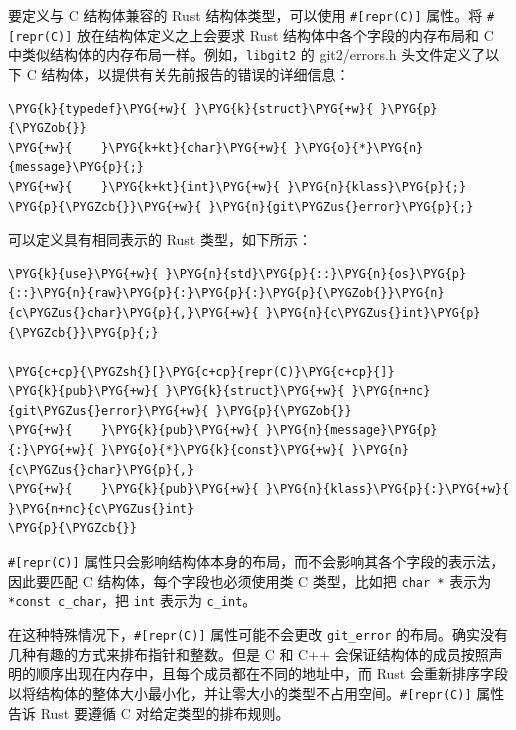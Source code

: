 要定义与 C 结构体兼容的 Rust 结构体类型，可以使用 \texttt{\#[repr(C)]} 属性。将 \texttt{\#[repr(C)]} 放在结构体定义之上会要求 Rust 结构体中各个字段的内存布局和 C 中类似结构体的内存布局一样。例如，\texttt{libgit2} 的 git2/\allowbreak{}errors.h 头文件定义了以下 C 结构体，以提供有关先前报告的错误的详细信息：

\begin{Verbatim}[commandchars=\\\{\},breaklines=true,breakanywhere=true,fontsize=\codefont,xleftmargin=17bp]
\PYG{k}{typedef}\PYG{+w}{ }\PYG{k}{struct}\PYG{+w}{ }\PYG{p}{\PYGZob{}}
\PYG{+w}{    }\PYG{k+kt}{char}\PYG{+w}{ }\PYG{o}{*}\PYG{n}{message}\PYG{p}{;}
\PYG{+w}{    }\PYG{k+kt}{int}\PYG{+w}{ }\PYG{n}{klass}\PYG{p}{;}
\PYG{p}{\PYGZcb{}}\PYG{+w}{ }\PYG{n}{git\PYGZus{}error}\PYG{p}{;}
\end{Verbatim}

可以定义具有相同表示的 Rust 类型，如下所示：

\begin{Verbatim}[commandchars=\\\{\},breaklines=true,breakanywhere=true,fontsize=\codefont,xleftmargin=17bp]
\PYG{k}{use}\PYG{+w}{ }\PYG{n}{std}\PYG{p}{::}\PYG{n}{os}\PYG{p}{::}\PYG{n}{raw}\PYG{p}{:}\PYG{p}{:}\PYG{p}{\PYGZob{}}\PYG{n}{c\PYGZus{}char}\PYG{p}{,}\PYG{+w}{ }\PYG{n}{c\PYGZus{}int}\PYG{p}{\PYGZcb{}}\PYG{p}{;}

\PYG{c+cp}{\PYGZsh{}[}\PYG{c+cp}{repr(C)}\PYG{c+cp}{]}
\PYG{k}{pub}\PYG{+w}{ }\PYG{k}{struct}\PYG{+w}{ }\PYG{n+nc}{git\PYGZus{}error}\PYG{+w}{ }\PYG{p}{\PYGZob{}}
\PYG{+w}{    }\PYG{k}{pub}\PYG{+w}{ }\PYG{n}{message}\PYG{p}{:}\PYG{+w}{ }\PYG{o}{*}\PYG{k}{const}\PYG{+w}{ }\PYG{n}{c\PYGZus{}char}\PYG{p}{,}
\PYG{+w}{    }\PYG{k}{pub}\PYG{+w}{ }\PYG{n}{klass}\PYG{p}{:}\PYG{+w}{ }\PYG{n+nc}{c\PYGZus{}int}
\PYG{p}{\PYGZcb{}}
\end{Verbatim}

\texttt{\#[repr(C)]} 属性只会影响结构体本身的布局，而不会影响其各个字段的表示法，因此要匹配 C 结构体，每个字段也必须使用类 C 类型，比如把 \texttt{char *} 表示为 \texttt{*const c\_char}，把 \texttt{int} 表示为 \texttt{c\_int}。

在这种特殊情况下，\texttt{\#[repr(C)]} 属性可能不会更改 \texttt{git\_error} 的布局。确实没有几种有趣的方式来排布指针和整数。但是 C 和 C++ 会保证结构体的成员按照声明的顺序出现在内存中，且每个成员都在不同的地址中，而 Rust 会重新排序字段以将结构体的整体大小最小化，并让零大小的类型不占用空间。\texttt{\#[repr(C)]} 属性告诉 Rust 要遵循 C 对给定类型的排布规则。

